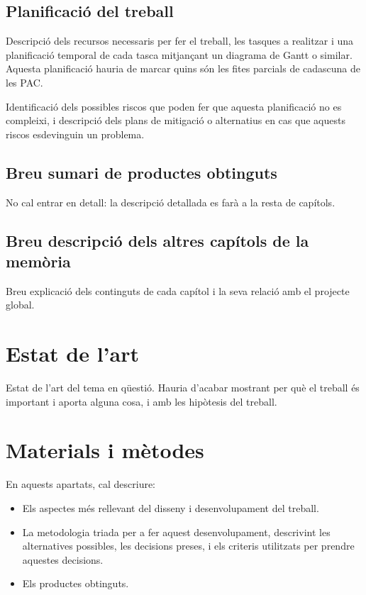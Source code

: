 \documentclass[CAT,BIB]{TFUOC}%
\begin{document}
\section{Planificació del treball}

Descripció dels recursos necessaris per fer el treball, les tasques a realitzar i una planificació temporal de cada tasca mitjançant un diagrama de Gantt o similar. Aquesta planificació hauria de marcar quins són les fites parcials de cadascuna de les PAC.


Identificació dels possibles riscos que poden fer que aquesta planificació no es compleixi, i descripció dels plans de mitigació o alternatius en cas que aquests riscos esdevinguin un problema.

\section{Breu sumari de productes obtinguts}

No cal entrar en detall: la descripció detallada es farà a la resta de capítols.


\section{Breu descripció dels altres capítols de la memòria}

Breu explicació dels continguts de cada capítol i la seva relació amb el projecte global.

\chapter{Estat de l'art}

Estat de l'art del tema en qüestió.
Hauria d'acabar mostrant per què el treball és important i aporta alguna cosa, i amb les hipòtesis del treball.


\chapter{Materials i mètodes}
En aquests apartats, cal descriure:
\begin{itemize}
    \item Els aspectes més rellevant del disseny i desenvolupament del treball.
    \item La metodologia triada per a fer aquest desenvolupament, descrivint les alternatives possibles, les decisions preses, i els criteris utilitzats per prendre aquestes decisions.
    \item Els productes obtinguts.
\end{itemize}
\end{document}
